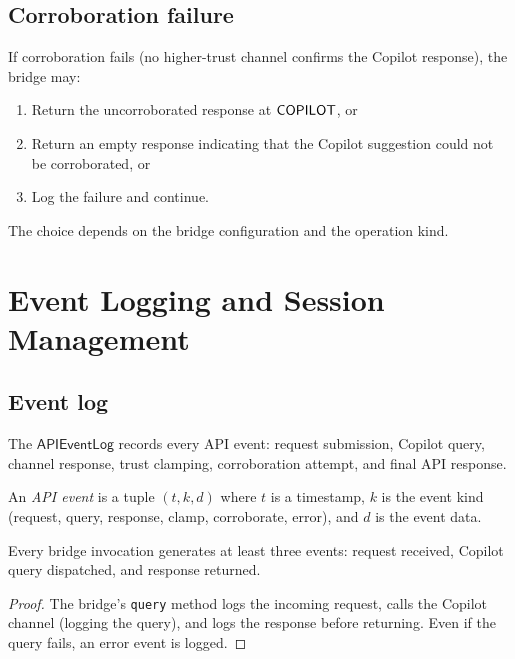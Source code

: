 \documentclass[11pt]{article}
\newcommand{\APILog}{\mathsf{APIEventLog}}
\begin{document}
\subsection{Corroboration failure}

If corroboration fails (no higher-trust channel confirms
the Copilot response), the bridge may:
\begin{enumerate}
\item Return the uncorroborated response at $\mathsf{COPILOT}$, or
\item Return an empty response indicating that the Copilot
      suggestion could not be corroborated, or
\item Log the failure and continue.
\end{enumerate}
The choice depends on the bridge configuration and the
operation kind.

\section{Event Logging and Session Management}\label{sec:logging}

\subsection{Event log}

The $\APILog$ records every API event: request submission,
Copilot query, channel response, trust clamping, corroboration
attempt, and final API response.

\begin{definition}\label{def:apievent}
An \emph{API event} is a tuple
$(t, k, d)$ where $t$ is a timestamp, $k$ is the event
kind (request, query, response, clamp, corroborate, error),
and $d$ is the event data.
\end{definition}

\begin{lemma}\label{lem:logcomp}
Every bridge invocation generates at least three events:
request received, Copilot query dispatched, and response
returned.
\end{lemma}
\begin{proof}
The bridge's \texttt{query} method logs the incoming request,
calls the Copilot channel (logging the query), and logs the
response before returning.  Even if the query fails, an error
event is logged.
\end{proof}
\end{document}
